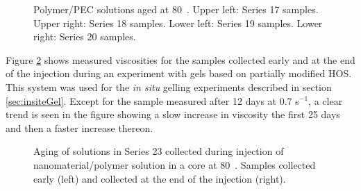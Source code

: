 \documentclass[nanomaterials,article,submit,moreauthors,pdftex]{Definitions/mdpi}
\begin{document}
\begin{figure}[h!]
    \centering
    \caption{Polymer/PEC solutions aged at 80~\celsius. Upper left: Series 17 samples. Upper right: Series 18 samples. Lower left: Series 19 samples. Lower right: Series 20 samples.}
    \label{cht:s17visc80}
\end{figure}

Figure \ref{cht:s23visc80} shows measured viscosities for the samples collected early and at the end of the injection during an experiment with gels based on partially modified HOS.
This system was used for the \textit{in situ} gelling experiments described in section \ref{sec:insiteGel}. Except for the sample measured after 12 days at 0.7 s$^{-1}$, a clear trend is seen in the figure showing a slow increase in viscosity the first 25 days and then a faster increase thereon.

\begin{figure}[h!] 
    \centering
    \caption{Aging of solutions in Series 23 collected during injection of nanomaterial/polymer solution in a core at 80~\celsius. Samples collected early (left) and collected at the end of the injection (right).}
    \label{cht:s23visc80}
\end{figure} 
\end{document}
